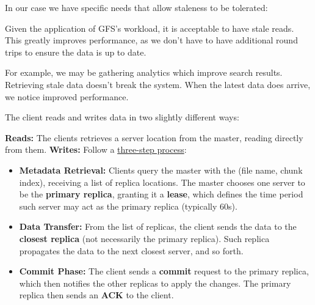 \noindent
In our case we have specific needs that allow staleness to be tolerated:
\begin{Def}

  Given the application of GFS's workload, it is acceptable to have stale reads. This greatly improves performance, as we don't have to 
  have additional round trips to ensure the data is up to date. 

  For example, we may be gathering analytics which improve search results. Retrieving stale data doesn't break the system. When the latest data does arrive, we notice improved performance.
\end{Def}
\newpage 
\noindent
The client reads and writes data in two slightly different ways:
\begin{Def}

  \textbf{Reads:} The clients retrieves a server location from the master, reading directly from them.
  \textbf{Writes:} Follow a \underline{three-step process}:
  \begin{itemize}
    \item \textbf{Metadata Retrieval:} Clients query the master with the (file name, chunk index), receiving a list of replica locations. The master chooses one server to be the \textbf{primary replica}, granting it a \textbf{lease}, which defines the time period such server may act as the primary replica (typically 60s).
    \item \textbf{Data Transfer:} From the list of replicas, the client sends the data to the \textbf{closest replica} (not necessarily the primary replica). Such replica propagates the data to the next closest server, and so forth.
    \item \textbf{Commit Phase:} The client sends a \textbf{commit} request to the primary replica, which then notifies the other replicas to apply the changes. The primary replica then sends an \textbf{ACK} to the client.
  \end{itemize}
\end{Def}

